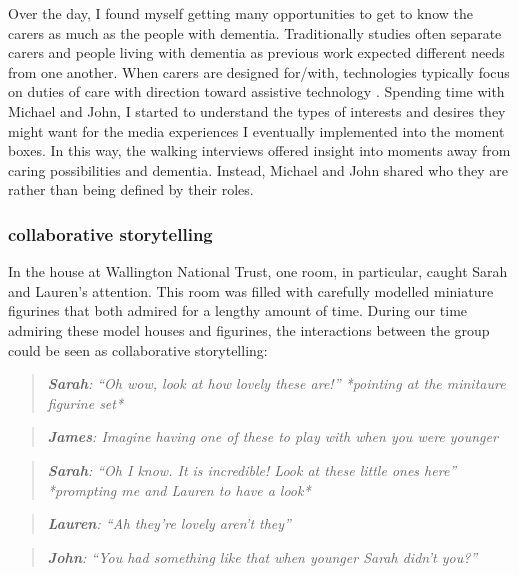 Over the day, I found myself getting many opportunities to get to know the carers as much as the people with dementia. Traditionally studies often separate carers and people living with dementia as previous work expected different needs from one another. When carers are designed for/with, technologies typically focus on duties of care with direction toward assistive technology \citep{bennett_assistive_2017, gibson2015everyday}. Spending time with Michael and John, I started to understand the types of interests and desires they might want for the media experiences I eventually implemented into the moment boxes. In this way, the walking interviews offered insight into moments away from caring possibilities and dementia. Instead, Michael and John shared who they are rather than being defined by their roles. 

\subsubsection{collaborative storytelling}
\label{CollabStorytelling}
In the house at Wallington National Trust, one room, in particular, caught Sarah and Lauren's attention. This room was filled with carefully modelled miniature figurines that both admired for a lengthy amount of time. During our time admiring these model houses and figurines, the interactions between the group could be seen as collaborative storytelling:
\begin{quote}
   \textit{\textbf{ Sarah}: ``Oh wow, look at how lovely these are!''
   *pointing at the minitaure figurine set*}
\end{quote}

\begin{quote}
    \textit{\textbf{James}:  Imagine having one of these to play with when you were younger}
\end{quote}

\begin{quote}
\textit{    \textbf{Sarah}: ``Oh I know. It is incredible! Look at these little ones here'' *prompting me and Lauren to have a look*}

\end{quote}

\begin{quote}
\textit{    \textbf{Lauren}: ``Ah they're lovely aren't they''
}
\end{quote}

\begin{quote}
\textit{    \textbf{John}: ``You had something like that when younger Sarah didn't you?''
}
\end{quote}

